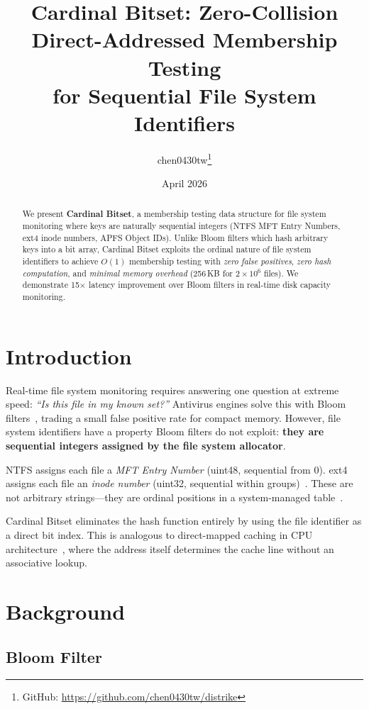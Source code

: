 \documentclass[11pt,twocolumn]{article}
\title{\textbf{Cardinal Bitset}: Zero-Collision Direct-Addressed Membership Testing\\for Sequential File System Identifiers}
\author{chen0430tw\thanks{GitHub: \url{https://github.com/chen0430tw/distrike}}}
\date{April 2026}
\begin{document}
\maketitle

\begin{abstract}
We present \textbf{Cardinal Bitset}, a membership testing data structure for file system monitoring where keys are naturally sequential integers (NTFS MFT Entry Numbers, ext4 inode numbers, APFS Object IDs). Unlike Bloom filters which hash arbitrary keys into a bit array, Cardinal Bitset exploits the ordinal nature of file system identifiers to achieve $O(1)$ membership testing with \emph{zero false positives}, \emph{zero hash computation}, and \emph{minimal memory overhead} (256\,KB for $2 \times 10^6$ files). We demonstrate 15$\times$ latency improvement over Bloom filters in real-time disk capacity monitoring.
\end{abstract}

\section{Introduction}

Real-time file system monitoring requires answering one question at extreme speed: \emph{``Is this file in my known set?''} Antivirus engines solve this with Bloom filters~\cite{bloom1970}, trading a small false positive rate for compact memory. However, file system identifiers have a property Bloom filters do not exploit: \textbf{they are sequential integers assigned by the file system allocator}.

NTFS assigns each file a \emph{MFT Entry Number} (uint48, sequential from 0). ext4 assigns each file an \emph{inode number} (uint32, sequential within groups)~\cite{mckusick1984}. These are not arbitrary strings---they are ordinal positions in a system-managed table~\cite{carrier2005}.

Cardinal Bitset eliminates the hash function entirely by using the file identifier as a direct bit index. This is analogous to direct-mapped caching in CPU architecture~\cite{hennessy2019}, where the address itself determines the cache line without an associative lookup.

\section{Background}

\subsection{Bloom Filter}
\end{document}
